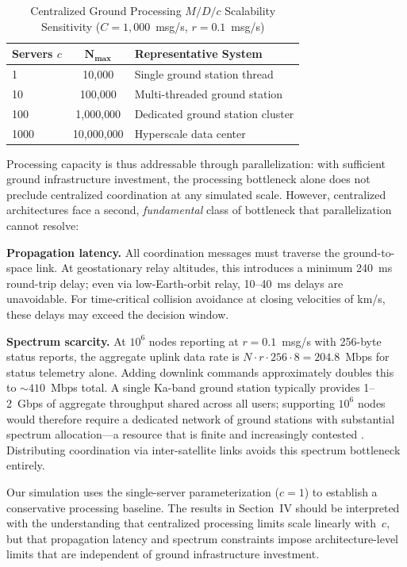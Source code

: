 \documentclass[journal]{IEEEtran}
\begin{document}
\begin{table}[t]
    \centering
    \caption{Centralized Ground Processing $M/D/c$ Scalability Sensitivity ($C = 1{,}000$~msg/s, $r = 0.1$~msg/s)}
    \label{tab:mdc_sensitivity}
    \begin{tabular}{@{}lcl@{}}
        \toprule
        \textbf{Servers $c$} & $\boldsymbol{N_{\max}}$ & \textbf{Representative System} \\
        \midrule
        1    & 10{,}000      & Single ground station thread \\
        10   & 100{,}000     & Multi-threaded ground station \\
        100  & 1{,}000{,}000 & Dedicated ground station cluster \\
        1000 & 10{,}000{,}000 & Hyperscale data center \\
        \bottomrule
    \end{tabular}
\end{table}

Processing capacity is thus addressable through parallelization: with sufficient ground infrastructure investment, the processing bottleneck alone does not preclude centralized coordination at any simulated scale. However, centralized architectures face a second, \emph{fundamental} class of bottleneck that parallelization cannot resolve:

\textbf{Propagation latency.} All coordination messages must traverse the ground-to-space link. At geostationary relay altitudes, this introduces a minimum 240~ms round-trip delay; even via low-Earth-orbit relay, 10--40~ms delays are unavoidable. For time-critical collision avoidance at closing velocities of km/s, these delays may exceed the decision window.

\textbf{Spectrum scarcity.} At $10^6$ nodes reporting at $r = 0.1$~msg/s with 256-byte status reports, the aggregate uplink data rate is $N \cdot r \cdot 256 \cdot 8 = 204.8$~Mbps for status telemetry alone. Adding downlink commands approximately doubles this to ${\sim}410$~Mbps total. A single Ka-band ground station typically provides 1--2~Gbps of aggregate throughput shared across all users; supporting $10^6$ nodes would therefore require a dedicated network of ground stations with substantial spectrum allocation---a resource that is finite and increasingly contested \cite{handley_2018}. Distributing coordination via inter-satellite links avoids this spectrum bottleneck entirely.

Our simulation uses the single-server parameterization ($c = 1$) to establish a conservative processing baseline. The results in Section~IV should be interpreted with the understanding that centralized processing limits scale linearly with~$c$, but that propagation latency and spectrum constraints impose architecture-level limits that are independent of ground infrastructure investment.
\end{document}
